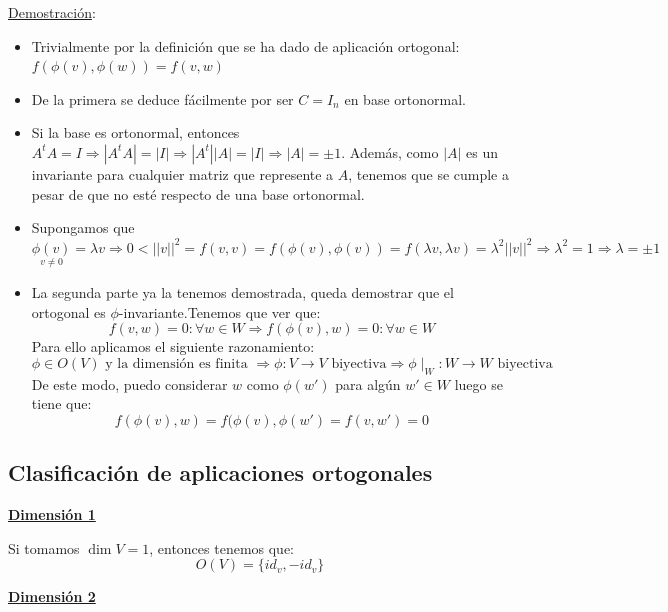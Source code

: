 \documentclass[10pt,a4paper,openright]{book}
\theoremstyle{break}
\begin{document}
\underline{Demostración}:
\begin{itemize}
\item Trivialmente por la definición que se ha dado de aplicación ortogonal: $f(\phi(v),\phi(w)) = f(v,w)$
\item De la primera se deduce fácilmente por ser $C=I_n$ en base ortonormal.
\item Si la base es ortonormal, entonces $A^tA = I\Rightarrow |A^tA| = |I|\Rightarrow |A^t||A| = |I|\Rightarrow |A| = \pm 1$. Además, como $|A|$ es un invariante para cualquier matriz que represente a $A$, tenemos que se cumple a pesar de que no esté respecto de una base ortonormal.
\item Supongamos que $\underset{v \neq 0}{\phi(v)} = \lambda v \Rightarrow 0<||v||^2 = f(v,v)  = f(\phi(v),\phi(v)) = f(\lambda v, \lambda v) = \lambda ^2 ||v||^2 \Rightarrow \lambda^2 = 1 \Rightarrow \lambda = \pm 1$
\item La segunda parte ya la tenemos demostrada, queda demostrar que el ortogonal es $\phi$-invariante.Tenemos que ver que:
$$f(v,w) = 0 : \forall w \in W \Rightarrow f(\phi(v), w) = 0: \forall w \in W$$
Para ello aplicamos el siguiente razonamiento:
$$\phi \in O(V) \mbox{ y la dimensión es finita }\Rightarrow \phi:V\to V \mbox{ biyectiva} \Rightarrow \phi \mid_W: W\to W \mbox{ biyectiva}$$
De este modo, puedo considerar $w$ como $\phi(w')$ para algún $w'\in W$ luego se tiene que:
$$f(\phi(v), w) = f(\phi(v),\phi(w') = f(v,w') = 0$$
\end{itemize}

\subsection{Clasificación de aplicaciones ortogonales}
\underline{\textbf{Dimensión 1}}

Si tomamos $\dim V = 1$, entonces tenemos que:
$$O(V) = \{id_v, -id_v\}$$

\underline{\textbf{Dimensión 2}}
\end{document}
